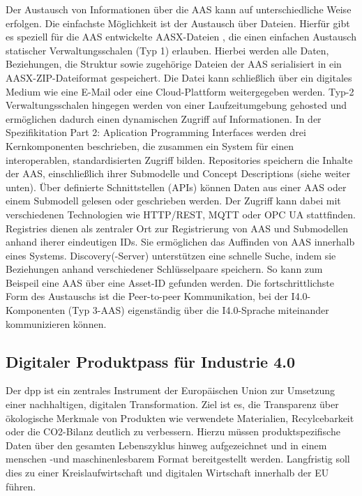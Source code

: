 Der Austausch von Informationen über die AAS kann auf unterschiedliche Weise erfolgen.
Die einfachste Möglichkeit ist der Austausch über Dateien. Hierfür gibt es speziell für die AAS entwickelte AASX-Dateien \cite{SpezifikationPart5}, die einen einfachen Austausch statischer Verwaltungsschalen (Typ 1) erlauben.
Hierbei werden alle Daten, Beziehungen, die Struktur sowie zugehörige Dateien der AAS serialisiert in ein AASX-ZIP-Dateiformat gespeichert. Die Datei kann schließlich über ein digitales Medium wie eine E-Mail oder eine Cloud-Plattform weitergegeben werden.  
Typ-2 Verwaltungsschalen hingegen werden von einer Laufzeitumgebung gehosted und ermöglichen dadurch einen dynamischen Zugriff auf Informationen. 
In der Spezifikitation Part 2: Aplication Programming Interfaces \cite{SpezifikationPart2} werden drei Kernkomponenten beschrieben, die zusammen ein System für einen interoperablen, standardisierten Zugriff bilden.
Repositories speichern die Inhalte der AAS, einschließlich ihrer Submodelle und Concept Descriptions (siehe weiter unten).
Über definierte Schnittstellen (APIs) können Daten aus einer AAS oder einem Submodell gelesen oder geschrieben werden.
Der Zugriff kann dabei mit verschiedenen Technologien wie HTTP/REST, MQTT oder OPC UA stattfinden.
Registries dienen als zentraler Ort zur Registrierung von AAS und Submodellen anhand iherer eindeutigen IDs. Sie ermöglichen das Auffinden von AAS innerhalb eines Systems.
Discovery(-Server) unterstützen eine schnelle Suche, indem sie Beziehungen anhand verschiedener Schlüsselpaare speichern. So kann zum Beispeil eine AAS über eine Asset-ID gefunden werden. 
Die fortschrittlichste Form des Austauschs ist die Peer-to-peer Kommunikation, bei der I4.0-Komponenten (Typ 3-AAS) eigenständig über die I4.0-Sprache miteinander kommunizieren können.

\newpage
\subsection{Digitaler Produktpass für Industrie 4.0}
Der \ac{dpp} ist ein zentrales Instrument der Europäischen Union zur Umsetzung einer nachhaltigen, digitalen Transformation.
Ziel ist es, die Transparenz über ökologische Merkmale von Produkten wie verwendete Materialien, Recylcebarkeit oder die CO2-Bilanz deutlich zu verbessern.
Hierzu müssen produktspezifische Daten über den gesamten Lebenszyklus hinweg aufgezeichnet und in einem menschen -und maschinenlesbarem Format bereitgestellt werden.
Langfristig soll dies zu einer Kreislaufwirtschaft und digitalen Wirtschaft innerhalb der EU führen.

